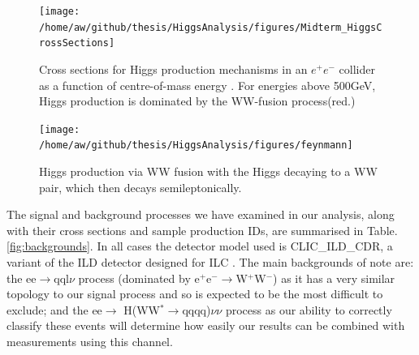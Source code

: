 \begin{figure}
  \centering
  \texttt{[image: /home/aw/github/thesis/HiggsAnalysis/figures/Midterm\_HiggsCrossSections]}
  \caption[Higgs Cross Sections]{Cross sections for Higgs production mechanisms in an ${e^+e^-}$ collider as a function of centre-of-mass energy \cite{Simon:2014aqa}. For energies above 500GeV, Higgs production is dominated by the WW-fusion process(red.)}
  \label{fig:HiggsCrossSections}
\end{figure}

\begin{figure}[h]
  \centering
  \texttt{[image: /home/aw/github/thesis/HiggsAnalysis/figures/feynmann]}
  \caption[Signal Feynmann Diagram]{Higgs production via WW fusion with the Higgs decaying to a WW pair, which then decays semileptonically.}
  \label{fig:feynmann}
\end{figure}


The signal and background processes we have examined in our analysis, along with their cross sections and sample production IDs, are summarised in Table. \ref{fig:backgrounds}. In all cases the detector model used is CLIC\_ILD\_CDR, a variant of the ILD detector designed for ILC \cite{CDR}. The main backgrounds of note are: the ee$\rightarrow$qql$\nu$ process (dominated by e$^+$e$^-\rightarrow$W$^+$W$^-$) as it has a very similar topology to our signal process and so is expected to be the most difficult to exclude; and the ee$\rightarrow$ H(WW$^*\rightarrow$qqqq)$\nu\nu$ process as our ability to correctly classify these events will determine how easily our results can be combined with measurements using this channel.

\renewcommand{\thefootnote}{\roman{footnote}}

